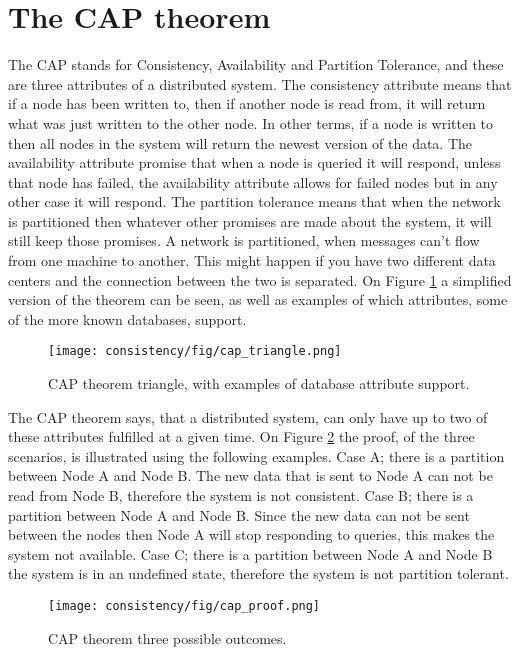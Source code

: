 \section{The CAP theorem}
The CAP stands for Consistency, Availability and Partition Tolerance, and these are three attributes of a distributed system. The consistency attribute means that if a node has been written to, then if another node is read from, it will return what was just written to the other node. In other terms, if a node is written to then all nodes in the system  will return the newest version of the data. The availability attribute promise that when a node is queried it will respond, unless that node has failed, the availability attribute allows for failed nodes but in any other case it will respond. The partition tolerance means that when the network is partitioned then whatever other promises are made about the system, it will still keep those promises. A network is partitioned, when messages can't flow from one machine to another. This might happen if you have two different data centers and the connection between the two is separated. On Figure \ref{fig:cap_triangle} a simplified version of the theorem can be seen, as well as examples of which attributes, some  of the more known databases, support.

\begin{figure}[h!]
	\centering
	\texttt{[image: consistency/fig/cap\_triangle.png]}
	\caption{CAP theorem triangle, with examples of database attribute support.}
	\label{fig:cap_triangle}
\end{figure}

The CAP theorem says, that a distributed system, can only have up to two of these attributes fulfilled at a given time. On Figure \ref{fig:cap_proof} the proof, of the three scenarios, is illustrated using the following examples. Case A; there is a partition between Node A and Node B. The new data that is sent to Node A can not be read from Node B, therefore the system is not consistent. Case B; there is a partition between Node A and Node B. Since the new data can not be sent between the nodes then Node A will stop responding to queries, this makes the system not available. Case C; there is a partition between Node A and Node B the system is in an undefined state, therefore the system is not partition tolerant.

\begin{figure}[h!]
	\centering
	\texttt{[image: consistency/fig/cap\_proof.png]}
	\caption{CAP theorem three possible outcomes.}
	\label{fig:cap_proof}
\end{figure}


